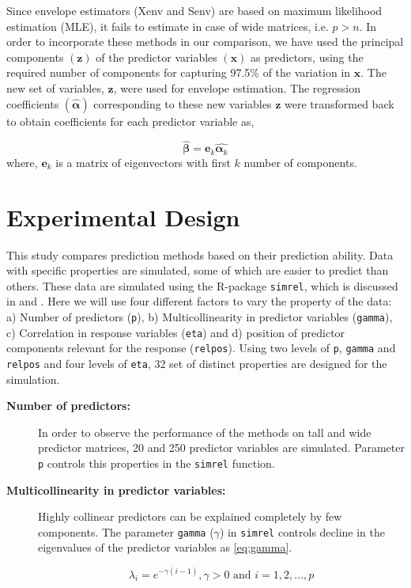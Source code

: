 \documentclass[12pt,3p,authoryear]{elsarticle}
\begin{document}
Since envelope estimators (Xenv and Senv) are based on maximum
likelihood estimation (MLE), it fails to estimate in case of wide
matrices, i.e. \(p > n\). In order to incorporate these methods in our
comparison, we have used the principal components \((\mathbf{z})\) of
the predictor variables \((\mathbf{x})\) as predictors, using the
required number of components for capturing 97.5\% of the variation in
\(\mathbf{x}\). The new set of variables, \(\mathbf{z}\), were used for
envelope estimation. The regression coefficients
\((\hat{\boldsymbol{\alpha}})\) corresponding to these new variables
\(\mathbf{z}\) were transformed back to obtain coefficients for each
predictor variable as,

\[\hat{\boldsymbol{\beta}} = \mathbf{e}_k\hat{\boldsymbol{\alpha}_k}\]
where, \(\mathbf{e}_k\) is a matrix of eigenvectors with first \(k\)
number of components.

\hypertarget{experimental-design}{\section{Experimental
Design}\label{experimental-design}}

This study compares prediction methods based on their prediction
ability. Data with specific properties are simulated, some of which are
easier to predict than others. These data are simulated using the
R-package \texttt{simrel}, which is discussed in \citet{saebo2015simrel}
and \citet{Rimal2018}. Here we will use four different factors to vary
the property of the data: a) Number of predictors (\texttt{p}), b)
Multicollinearity in predictor variables (\texttt{gamma}), c)
Correlation in response variables (\texttt{eta}) and d) position of
predictor components relevant for the response (\texttt{relpos}). Using
two levels of \texttt{p}, \texttt{gamma} and \texttt{relpos} and four
levels of \texttt{eta}, 32 set of distinct properties are designed for
the simulation.

\begin{description}
\item[\textbf{Number of predictors:}]
In order to observe the performance of the methods on tall and wide
predictor matrices, 20 and 250 predictor variables are simulated.
Parameter \texttt{p} controls this properties in the \texttt{simrel}
function.
\item[\textbf{Multicollinearity in predictor variables:}]
Highly collinear predictors can be explained completely by few
components. The parameter \texttt{gamma} (\(\gamma\)) in \texttt{simrel}
controls decline in the eigenvalues of the predictor variables as
\eqref{eq:gamma}.

\begin{equation}
  \lambda_i = e^{-\gamma(i - 1)}, \gamma > 0 \text{ and } i = 1, 2, \ldots, p
  \label{eq:gamma}
\end{equation}
\end{description}
\end{document}
